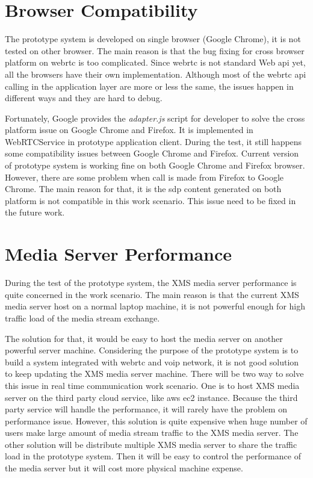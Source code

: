 \section{Browser Compatibility}

\par The prototype system is developed on single browser (Google Chrome), it is not tested on other browser. The main reason is that the bug fixing for cross browser platform on \gls{webrtc} is too complicated. Since \gls{webrtc} is not standard Web \gls{api} yet, all the browsers have their own implementation. Although most of the \gls{webrtc} \gls{api} calling in the application layer are more or less the same, the issues happen in different ways and they are hard to debug.

\par Fortunately, Google provides the \textit{adapter.js} script for developer to solve the cross platform issue on Google Chrome and Firefox. It is implemented in WebRTCService in prototype application client. During the test, it still happens some compatibility issues between Google Chrome and Firefox. Current version of prototype system is working fine on both Google Chrome and Firefox browser. However, there are some problem when call is made from Firefox to Google Chrome. The main reason for that, it is the \gls{sdp} content generated on both platform is not compatible in this work scenario. This issue need to be fixed in the future work.

\section{Media Server Performance}

\par During the test of the prototype system, the XMS media server performance is quite concerned in the work scenario. The main reason is that the current XMS media server host on a normal laptop machine, it is not powerful enough for high traffic load of the media stream exchange.

\par The solution for that, it would be easy to host the media server on another powerful server machine. Considering the purpose of the prototype system is to build a system integrated with \gls{webrtc} and \gls{voip} network, it is not good solution to keep updating the XMS media server machine. There will be two way to solve this issue in real time communication work scenario. One is to host XMS media server on the third party cloud service, like \gls{aws} \gls{ec2} instance. Because the third party service will handle the performance, it will rarely have the problem on performance issue. However, this solution is quite expensive when huge number of users make large amount of media stream traffic to the XMS media server. The other solution will be distribute multiple XMS media server to share the traffic load in the prototype system. Then it will be easy to control the performance of the media server but it will cost more physical machine expense.


